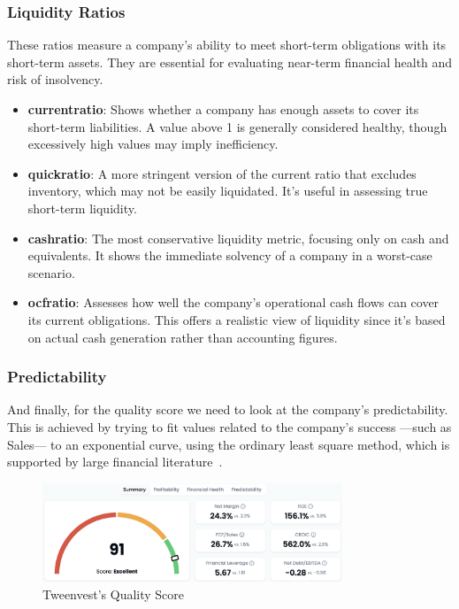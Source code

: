 \documentclass[11pt,english,a4paper,hidelinks]{book}
\begin{document}
\subsubsection{Liquidity Ratios}
These ratios measure a company's ability to meet short-term obligations with its short-term assets. They are essential for evaluating near-term financial health and risk of insolvency.

\begin{itemize}
    \item \textbf{\acrshort{currentratio}}: Shows whether a company has enough assets to cover its short-term liabilities. A value above 1 is generally considered healthy, though excessively high values may imply inefficiency.
    
    \item \textbf{\acrshort{quickratio}}: A more stringent version of the current ratio that excludes inventory, which may not be easily liquidated. It's useful in assessing true short-term liquidity.
    
    \item \textbf{\acrshort{cashratio}}: The most conservative liquidity metric, focusing only on cash and equivalents. It shows the immediate solvency of a company in a worst-case scenario.
    
    \item \textbf{\acrshort{ocfratio}}: Assesses how well the company's operational cash flows can cover its current obligations. This offers a realistic view of liquidity since it's based on actual cash generation rather than accounting figures.
\end{itemize}

\subsubsection{Predictability}

\noindent And finally, for the quality score we need to look at the company's predictability. This is achieved by trying to fit values related to the company's success —such as Sales— to an exponential curve, using the ordinary least square method, which is supported by large financial literature~\cite{msci2024fundamental}.


\begin{figure}[H]
    \centering
    \includegraphics[width=0.8\textwidth]{images/tweenvest/quality score.png}
    \caption{Tweenvest's Quality Score}
    \label{fig:quality_score}
\end{figure}
\end{document}
